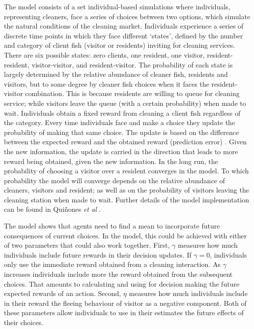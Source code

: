 \documentclass[]{rsos}%
\begin{document}
The model consists of a set individual-based simulations where
individuals, representing cleaners, face a series of choices
between two options, which simulate the natural conditions
of the cleaning market. Individuals experience a series
of discrete time points in which they face different `states',
defined by the number and category of client fish (visitor or residents)
inviting for cleaning services. There are six possible states:
zero clients, one resident, one visitor,
resident-resident, visitor-visitor, and resident-visitor.
The probability of each state is largely determined by the relative
abundance of cleaner fish, residents and visitors, but to some degree by
cleaner fish choices when it faces the resident-visitor combination.
This is because residents are willing to queue for cleaning service;
while visitors leave the queue (with a certain probability) when made to wait.
Individuals obtain a fixed reward from cleaning a client fish
regardless of the category. Every time individuals face and make a choice
they update the probability of making that same choice. The update is
based on the difference between the expected reward and the obtained
reward (prediction error) \citep{sutton_Reinforcement_2018, rescorla_Theory_1972}. Given the new information, the update is carried
in the direction that leads to more reward being obtained, given
the new information. In the long run, the probability of choosing a visitor
over a resident converges in the model. To which probability the model
will converge depends on the relative abundance of cleaners, visitors
and resident; as well as on the probability of visitors leaving the
cleaning station when made to wait. Further details of the model
implementation can be found in Quiñones \emph{et al} \citep{quinones_Reinforcement_2019}.

The model shows that agents need to find a mean
to incorporate future consequences of current choices. In the model,
this could be achieved with either of two parameters that could
also work together. First, \(\gamma\) measures how
much individuals include future rewards in their decision updates. If
\(\gamma=0\), individuals only use the immediate reward obtained from a
cleaning interaction. As \(\gamma\) increases individuals include more the
reward obtained from the subsequent choices. That amounts to calculating
and using for decision making the future expected rewards of an action.
Second, \(\eta\) measures how much individuals include in their reward the
fleeing behaviour of visitor as a negative component. Both of
these parameters allow individuals to use in their estimates the future
effects of their choices.
\end{document}
